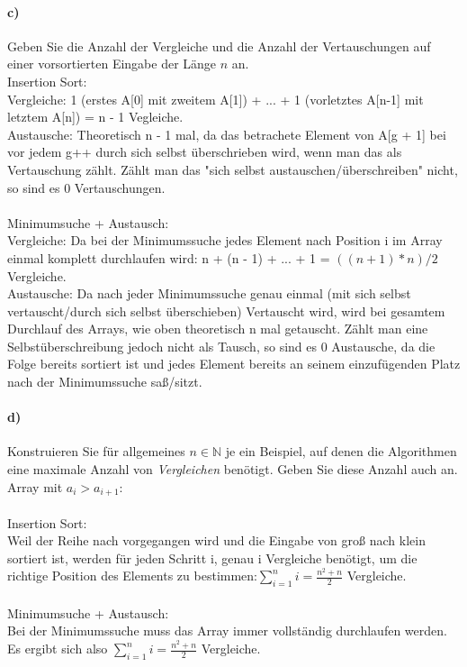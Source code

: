 \documentclass[paper=a4, fontsize=11pt]{scrartcl}
\numberwithin{equation}{section}
\numberwithin{figure}{section}
\numberwithin{table}{section}
\begin{document}
\paragraph{c)}
Geben Sie die Anzahl der Vergleiche und die Anzahl der Vertauschungen auf einer vorsortierten Eingabe der Länge $n$ an. \\

Insertion Sort:\\
Vergleiche: 1 (erstes A[0] mit zweitem A[1]) + ... + 1 (vorletztes A[n-1] mit letztem A[n]) = n - 1 Vegleiche.\\
Austausche: Theoretisch n - 1 mal, da das betrachete Element von A[g + 1] bei vor jedem g++ durch sich selbst überschrieben wird, wenn man das als Vertauschung zählt. Zählt man das "sich selbst austauschen/überschreiben" nicht, so sind es 0 Vertauschungen.\\
\\
Minimumsuche + Austausch:\\
Vergleiche: Da bei der Minimumssuche jedes Element nach Position i im Array einmal komplett durchlaufen wird: n + (n - 1) + ... + 1 = $((n+1)*n)/2$ Vergleiche.\\
Austausche: Da nach jeder Minimumssuche genau einmal (mit sich selbst vertauscht/durch sich selbst überschieben) Vertauscht wird, wird bei gesamtem Durchlauf des Arrays, wie oben theoretisch n mal getauscht. Zählt man eine Selbstüberschreibung jedoch nicht als Tausch, so sind es 0 Austausche, da die Folge bereits sortiert ist und jedes Element bereits an seinem einzufügenden Platz nach der Minimumssuche saß/sitzt.

\paragraph{d)}
Konstruieren Sie für allgemeines $n\in \mathbb N$ je ein Beispiel, auf denen die Algorithmen eine maximale Anzahl von \textit{Vergleichen} benötigt. Geben Sie diese Anzahl auch an. \\

Array mit $a_{i}>a_{i+1}$:\\
\\
Insertion Sort:\\
Weil der Reihe nach vorgegangen wird und die Eingabe von groß nach klein sortiert ist, werden für jeden Schritt i, genau i Vergleiche benötigt, um die richtige Position des Elements zu bestimmen:$\sum_{i=1}^n i = \frac{n^2+n}{2}$ Vergleiche.\\
\\
Minimumsuche + Austausch:\\
Bei der Minimumssuche muss das Array immer vollständig durchlaufen werden. Es ergibt sich also $\sum_{i=1}^n i = \frac{n^2+n}{2}$ Vergleiche.
\end{document}
